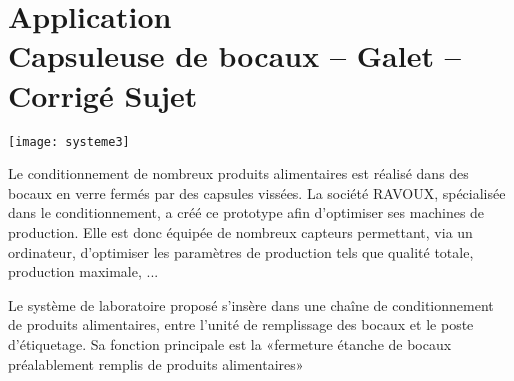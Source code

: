 \chapter*{Application  \\ 
Capsuleuse de bocaux -- Galet -- \ifprof Corrigé \else Sujet \fi}

\iflivret {} \else
\ifprof  {} \else \fi
\fi

\setcounter{question}{0}

\marginnote[1cm]{
}


\begin{marginfigure}
 \texttt{[image: systeme3]}
\end{marginfigure}

\ifprof
\else
Le conditionnement de nombreux produits alimentaires est réalisé dans des bocaux en verre fermés par des capsules vissées. La société RAVOUX, spécialisée dans le conditionnement, a créé ce prototype afin d'optimiser ses machines de production. Elle est donc équipée de nombreux capteurs permettant, via un ordinateur, d'optimiser les paramètres de production tels que qualité totale, production maximale, ...

Le système de laboratoire proposé s'insère dans une chaîne de conditionnement de produits alimentaires, entre l'unité de remplissage des bocaux et le poste d'étiquetage. Sa fonction principale est la «fermeture étanche de bocaux préalablement remplis de produits alimentaires»


%




